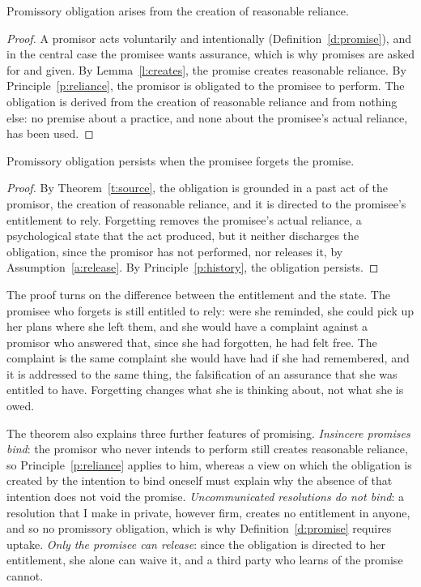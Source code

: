 \documentclass{situationist-preprint}
\begin{document}
\begin{theorem}[Source]\label{t:source}
Promissory obligation arises from the creation of reasonable reliance.
\end{theorem}

\begin{proof}
A promisor acts voluntarily and intentionally (Definition~\ref{d:promise}), and in the central case the promisee wants assurance, which is why promises are asked for and given. By Lemma~\ref{l:creates}, the promise creates reasonable reliance. By Principle~\ref{p:reliance}, the promisor is obligated to the promisee to perform. The obligation is derived from the creation of reasonable reliance and from nothing else: no premise about a practice, and none about the promisee's actual reliance, has been used.
\end{proof}

\begin{theorem}[Persistence]\label{t:persist}
Promissory obligation persists when the promisee forgets the promise.
\end{theorem}

\begin{proof}
By Theorem~\ref{t:source}, the obligation is grounded in a past act of the promisor, the creation of reasonable reliance, and it is directed to the promisee's entitlement to rely. Forgetting removes the promisee's actual reliance, a psychological state that the act produced, but it neither discharges the obligation, since the promisor has not performed, nor releases it, by Assumption~\ref{a:release}. By Principle~\ref{p:history}, the obligation persists.
\end{proof}

The proof turns on the difference between the entitlement and the state. The promisee who forgets is still entitled to rely: were she reminded, she could pick up her plans where she left them, and she would have a complaint against a promisor who answered that, since she had forgotten, he had felt free. The complaint is the same complaint she would have had if she had remembered, and it is addressed to the same thing, the falsification of an assurance that she was entitled to have. Forgetting changes what she is thinking about, not what she is owed.

The theorem also explains three further features of promising. \emph{Insincere promises bind}: the promisor who never intends to perform still creates reasonable reliance, so Principle~\ref{p:reliance} applies to him, whereas a view on which the obligation is created by the intention to bind oneself must explain why the absence of that intention does not void the promise. \emph{Uncommunicated resolutions do not bind}: a resolution that I make in private, however firm, creates no entitlement in anyone, and so no promissory obligation, which is why Definition~\ref{d:promise} requires uptake. \emph{Only the promisee can release}: since the obligation is directed to her entitlement, she alone can waive it, and a third party who learns of the promise cannot.
\end{document}

